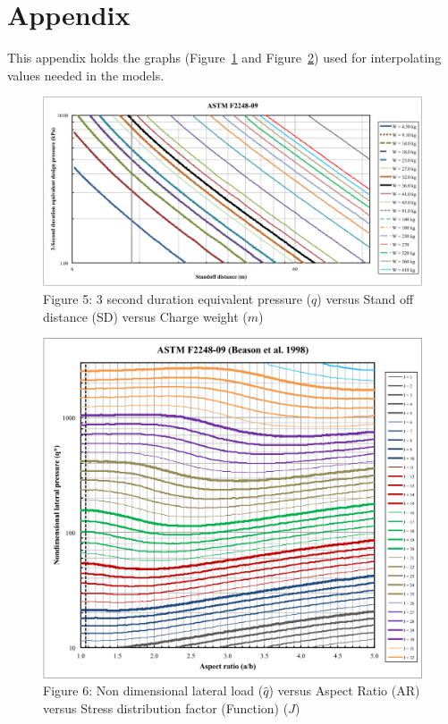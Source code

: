 \documentclass[12pt]{article}
\begin{document}
\section{Appendix}
\label{Sec:Appe}
This appendix holds the graphs (Figure~\ref{Figure:Figu5:3secoduraequipres()versStanoffdist(SD)versCharweig()} and Figure~\ref{Figure:Figu6:Nondimelateload()versAspeRati(AR)versStredistfact(Fun()}) used for interpolating values needed in the models.
\begin{figure}
\begin{center}
\includegraphics[width=\textwidth]{../../../datafiles/GlassBR/ASTM_F2248-09.png}
\caption{Figure 5: 3 second duration equivalent pressure ($q$) versus Stand off distance (SD) versus Charge weight ($m$)}
\label{Figure:Figu5:3secoduraequipres()versStanoffdist(SD)versCharweig()}
\end{center}
\end{figure}
\begin{figure}
\begin{center}
\includegraphics[width=\textwidth]{../../../datafiles/GlassBR/ASTM_F2248-09_BeasonEtAl.png}
\caption{Figure 6: Non dimensional lateral load ($\hat{q}$) versus Aspect Ratio (AR) versus Stress distribution factor (Function) ($J$)}
\label{Figure:Figu6:Nondimelateload()versAspeRati(AR)versStredistfact(Fun()}
\end{center}
\end{figure}
\end{document}
